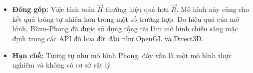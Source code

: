 \begin{enumerate}
\begin{itemize}
\begin{enumerate}
			Với:\\
			- $k_s$ là hệ số phản xạ gương tương ứng với thành phần ánh sáng.\\
			- $I_s$ là cường độ của thành phần ánh sáng.\\
			- $\vec{L}$ là vector đơn vị chỉ hướng từ mảnh đang xét đến nguồn sáng.\\
			- $\vec{R}$ là vector đơn vị phản xạ hướng chiếu sáng.\\
			- $\vec{V}$ là vector đơn vị từ vị trí của mảnh đến camera.\\
			- $\vec{H}$ là vector đơn vị nửa góc.
		\end{enumerate}
		
		\item \textbf{Đóng góp:}
		Việc tính toán $\vec{H}$ thường hiệu quả hơn $\vec{R}$. Mô hình này cũng cho kết quả trông tự nhiên hơn trong một số trường hợp. Do hiệu quả của mô hình, Blinn-Phong đã được sử dụng rộng rãi làm mô hình chiếu sáng mặc định trong các API đồ họa đời đầu như OpenGL và Direct3D.
		
		\item \textbf{Hạn chế:}
		Tương tự như mô hình Phong, đây vẫn là một mô hình thực nghiệm và không có cơ sở vật lý.
	\end{itemize}
	
\end{enumerate}

